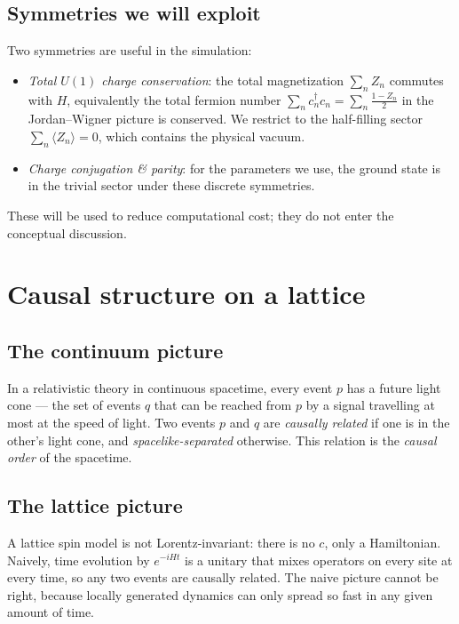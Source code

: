 \documentclass[11pt,a4paper]{article}
\theoremstyle{definition}
\theoremstyle{plain}
\theoremstyle{remark}
\begin{document}
\subsection{Symmetries we will exploit}

Two symmetries are useful in the simulation:
\begin{itemize}[nosep]
  \item \emph{Total $U(1)$ charge conservation}: the total
        magnetization $\sum_n Z_n$ commutes with $H$, equivalently the
        total fermion number $\sum_n c^\dagger_n c_n = \sum_n \tfrac{1-Z_n}{2}$
        in the Jordan--Wigner picture is conserved.  We restrict to
        the half-filling sector $\sum_n \langle Z_n \rangle = 0$,
        which contains the physical vacuum.
  \item \emph{Charge conjugation \& parity}: for the parameters
        we use, the ground state is in the trivial sector under
        these discrete symmetries.
\end{itemize}
These will be used to reduce computational cost; they do not enter
the conceptual discussion.

\section{Causal structure on a lattice}\label{sec:causal-lattice}

\subsection{The continuum picture}

In a relativistic theory in continuous spacetime, every event $p$
has a future light cone --- the set of events $q$ that can be
reached from $p$ by a signal travelling at most at the speed of
light.  Two events $p$ and $q$ are
\emph{causally related} if one is in the other's light cone, and
\emph{spacelike-separated} otherwise.  This relation is the
\emph{causal order} of the spacetime.

\subsection{The lattice picture}

A lattice spin model is not Lorentz-invariant: there is no $c$, only
a Hamiltonian.  Naively, time evolution by $e^{-iHt}$ is a unitary
that mixes operators on every site at every time, so any two events
are causally related.  The naive picture cannot be right, because
locally generated dynamics can only spread so fast in any given
amount of time.
\end{document}
